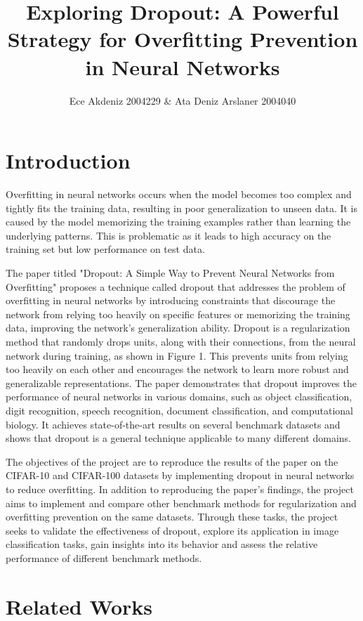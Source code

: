 \documentclass{article}
\title{Exploring Dropout: A Powerful Strategy for Overfitting Prevention in Neural Networks}
\author{Ece Akdeniz 2004229 & Ata Deniz Arslaner 2004040}
\begin{document}
\maketitle

\section{Introduction}
Overfitting in neural networks occurs when the model becomes too complex and tightly fits the training data, resulting in poor generalization to unseen data. It is caused by the model memorizing the training examples rather than learning the underlying patterns. This is problematic as it leads to high accuracy on the training set but low performance on test data. 

The paper titled "Dropout: A Simple Way to Prevent Neural Networks from Overfitting" proposes a technique called dropout that addresses the problem of overfitting in neural networks by introducing constraints that discourage the network from relying too heavily on specific features or memorizing the training data, improving the network's generalization ability. Dropout is a regularization method that randomly drops units, along with their connections, from the neural network during training, as shown in Figure 1. This prevents units from relying too heavily on each other and encourages the network to learn more robust and generalizable representations. The paper demonstrates that dropout improves the performance of neural networks in various domains, such as object classification, digit recognition, speech recognition, document classification, and computational biology. It achieves state-of-the-art results on several benchmark datasets and shows that dropout is a general technique applicable to many different domains.

The objectives of the project are to reproduce the results of the paper on the CIFAR-10 and CIFAR-100 datasets by implementing dropout in neural networks to reduce overfitting. In addition to reproducing the paper's findings, the project aims to implement and compare other benchmark methods for regularization and overfitting prevention on the same datasets. Through these tasks, the project seeks to validate the effectiveness of dropout, explore its application in image classification tasks, gain insights into its behavior and assess the relative performance of different benchmark methods. 

\section{Related Works}
\end{document}
